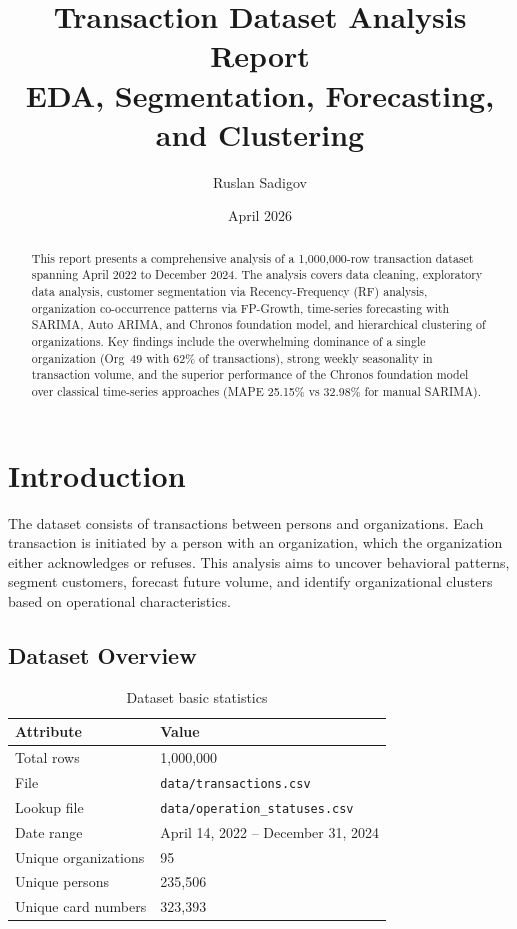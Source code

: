 \documentclass[11pt,a4paper]{article}
\title{\textbf{Transaction Dataset Analysis Report} \\
\large EDA, Segmentation, Forecasting, and Clustering}
\author{Ruslan Sadigov}
\date{April 2026}
\begin{document}
\maketitle

\begin{abstract}
This report presents a comprehensive analysis of a 1{,}000{,}000-row transaction dataset spanning April 2022 to December 2024. The analysis covers data cleaning, exploratory data analysis, customer segmentation via Recency-Frequency (RF) analysis, organization co-occurrence patterns via FP-Growth, time-series forecasting with SARIMA, Auto ARIMA, and Chronos foundation model, and hierarchical clustering of organizations. Key findings include the overwhelming dominance of a single organization (Org~49 with 62\% of transactions), strong weekly seasonality in transaction volume, and the superior performance of the Chronos foundation model over classical time-series approaches (MAPE 25.15\% vs 32.98\% for manual SARIMA).
\end{abstract}

\tableofcontents
\newpage

\section{Introduction}

The dataset consists of transactions between persons and organizations. Each transaction is initiated by a person with an organization, which the organization either acknowledges or refuses. This analysis aims to uncover behavioral patterns, segment customers, forecast future volume, and identify organizational clusters based on operational characteristics.

\subsection{Dataset Overview}

\begin{table}[H]
\centering
\begin{tabular}{ll}
\toprule
\textbf{Attribute} & \textbf{Value} \\
\midrule
Total rows & 1{,}000{,}000 \\
File & \texttt{data/transactions.csv} \\
Lookup file & \texttt{data/operation\_statuses.csv} \\
Date range & April 14, 2022 -- December 31, 2024 \\
Unique organizations & 95 \\
Unique persons & 235{,}506 \\
Unique card numbers & 323{,}393 \\
\bottomrule
\end{tabular}
\caption{Dataset basic statistics}
\end{table}
\end{document}
